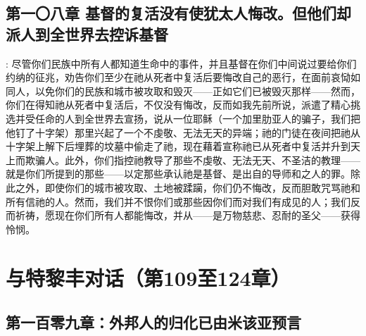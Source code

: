 
\subsection{第一〇八章 基督的复活没有使犹太人悔改。但他们却派人到全世界去控诉基督}

: 尽管你们民族中所有人都知道生命中的事件，并且基督在你们中间说过要给你们约纳的征兆，劝告你们至少在祂从死者中复活后要悔改自己的恶行，在面前哀恸如同人，以免你们的民族和城市被攻取和毁灭——正如它们已被毁灭那样——然而，你们在得知祂从死者中复活后，不仅没有悔改，反而如我先前所说，派遣了精心挑选并受任命的人到全世界去宣扬，说从一位耶稣（一个加里肋亚人的骗子，我们把他钉了十字架）那里兴起了一个不虔敬、无法无天的异端；祂的门徒在夜间把祂从十字架上解下后埋葬的坟墓中偷走了祂，现在藉着宣称祂已从死者中复活并升到天上而欺骗人。此外，你们指控祂教导了那些不虔敬、无法无天、不圣洁的教理——就是你们所提到的那些——以定那些承认祂是基督、是出自的导师和之人的罪。除此之外，即使你们的城市被攻取、土地被蹂躏，你们仍不悔改，反而胆敢咒骂祂和所有信祂的人。然而，我们并不恨你们或那些因你们而对我们有成见的人；我们反而祈祷，愿现在你们所有人都能悔改，并从——是万物慈悲、忍耐的圣父——获得怜悯。\par



\section{与特黎丰对话（第109至124章）}


\subsection{第一百零九章：外邦人的归化已由米该亚预言}

